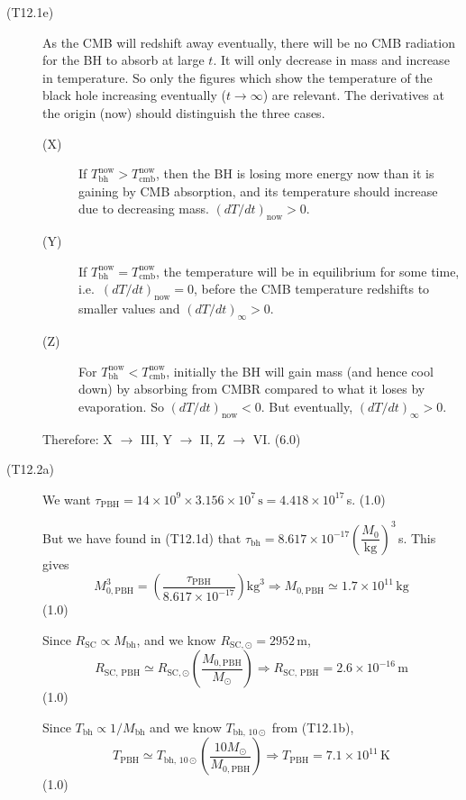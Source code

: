\begin{description}
\item[(T12.1e)] As the CMB will redshift away eventually, there will be no
  CMB radiation for the BH to absorb at large $t$. It will only decrease in
  mass and increase in temperature. So only the figures which show the
  temperature of the black hole increasing eventually ($t \to \infty$) are
  relevant. The derivatives at the origin (now) should distinguish the three
  cases.
  \begin{description}
  \item[(X)] If $T_{\mathrm{bh}}^{\mathrm{now}} >
    T_{\mathrm{cmb}}^{\mathrm{now}}$, then the BH is losing more energy now
    than it is gaining by CMB absorption, and its temperature should increase
    due to decreasing mass. $(dT/dt)_{\mathrm{now}} > 0$.
  \item[(Y)] If $T_{\mathrm{bh}}^{\mathrm{now}} =
    T_{\mathrm{cmb}}^{\mathrm{now}}$, the temperature will be in equilibrium
    for some time, i.e.\ $(dT/dt)_{\mathrm{now}} = 0$, before the CMB
    temperature redshifts to smaller values and $(dT/dt)_{\infty} > 0$.
  \item[(Z)] For $T_{\mathrm{bh}}^{\mathrm{now}} <
    T_{\mathrm{cmb}}^{\mathrm{now}}$, initially the BH will gain mass (and
    hence cool down) by absorbing from CMBR compared to what it loses by
    evaporation. So $(dT/dt)_{\mathrm{now}} < 0$. But eventually,
    $(dT/dt)_{\infty} > 0$.
  \end{description}
  Therefore: X $\to$ III, \quad Y $\to$ II, \quad Z $\to$ VI. \hfill(6.0)

\item[(T12.2a)] We want
  $\tau_{\mathrm{PBH}} = 14 \times 10^{9} \times 3.156 \times 10^{7}\,\mathrm{s}
  = 4.418 \times 10^{17}$\,s. \hfill(1.0)

  But we have found in (T12.1d) that
  $\tau_{\mathrm{bh}} = 8.617 \times 10^{-17}
  \left(\dfrac{M_0}{\mathrm{kg}}\right)^3$\,s. This gives
  \[
    M_{0,\mathrm{PBH}}^3
    = \left(\frac{\tau_{\mathrm{PBH}}}{8.617 \times 10^{-17}}\right)
      \mathrm{kg}^3
    \Rightarrow M_{0,\mathrm{PBH}} \simeq 1.7 \times 10^{11}\,\mathrm{kg}
  \]
  \hfill(1.0)

  Since $R_{\mathrm{SC}} \propto M_{\mathrm{bh}}$, and we know
  $R_{\mathrm{SC,\odot}} = 2952$\,m,
  \[
    R_{\mathrm{SC,\,PBH}} \simeq R_{\mathrm{SC,\odot}}
    \left(\frac{M_{0,\mathrm{PBH}}}{M_\odot}\right)
    \Rightarrow R_{\mathrm{SC,\,PBH}} = 2.6 \times 10^{-16}\,\mathrm{m}
  \]
  \hfill(1.0)

  Since $T_{\mathrm{bh}} \propto 1/M_{\mathrm{bh}}$ and we know
  $T_{\mathrm{bh,\,10\odot}}$ from (T12.1b),
  \[
    T_{\mathrm{PBH}} \simeq T_{\mathrm{bh,\,10\odot}}
    \left(\frac{10 M_\odot}{M_{0,\mathrm{PBH}}}\right)
    \Rightarrow T_{\mathrm{PBH}} = 7.1 \times 10^{11}\,\mathrm{K}
  \]
  \hfill(1.0)


\end{description}
